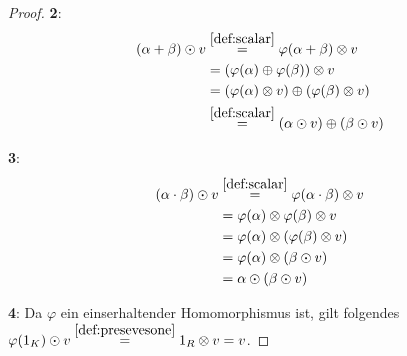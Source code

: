 \documentclass{../problemset}
\begin{document}
\begin{problem}
\begin{proof}
	\textbf{2}: \begin{align*}
		(\alpha + \beta) \odot v & \stackrel{\ref{def:scalar}}{=} \varphi(\alpha + \beta) \otimes v       \\
		                         & = (\varphi(\alpha) \oplus \varphi(\beta)) \otimes v                    \\
		                         & = (\varphi(\alpha) \otimes v) \oplus (\varphi(\beta) \otimes v)        \\
		                         & \stackrel{\ref{def:scalar}}{=} (\alpha \odot v) \oplus (\beta \odot v)
	\end{align*}

	\textbf{3}: \begin{align*}
		(\alpha \cdot \beta) \odot v & \stackrel{\ref{def:scalar}}{=} \varphi(\alpha \cdot \beta) \otimes v \\
		                             & = \varphi(\alpha) \otimes \varphi(\beta) \otimes v                   \\
		                             & = \varphi(\alpha) \otimes (\varphi(\beta) \otimes v)                 \\
		                             & = \varphi(\alpha) \otimes (\beta \odot v)                            \\
		                             & = \alpha \odot (\beta \odot v)                                       \\
	\end{align*}

	\textbf{4}: Da $\varphi$ ein einserhaltender Homomorphismus ist, gilt folgendes $\varphi(1_K) \odot v \stackrel{\ref{def:presevesone}}{=} 1_R \otimes v = v$. \checkmark
\end{proof}
\end{problem}

\pagebreak
\end{document}
